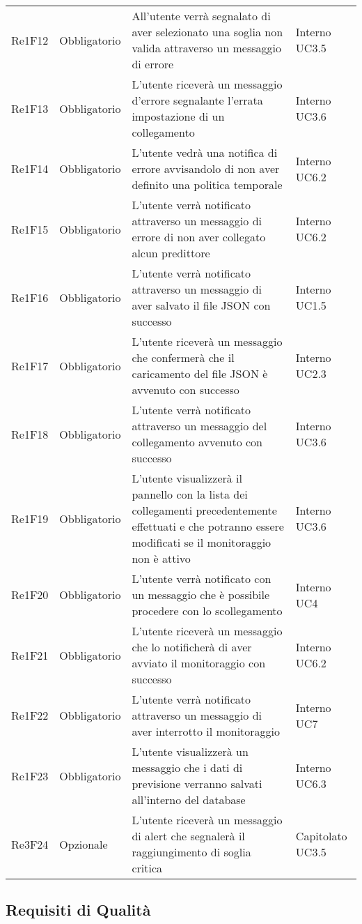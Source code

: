 \begin{longtable}{C{3cm} C{3cm} L{5.5cm} C{3cm}}
Re1F12 & Obbligatorio & All’utente verrà segnalato di aver selezionato una soglia non valida attraverso un messaggio di errore &  Interno
UC3.5\\
Re1F13 & Obbligatorio & 
L’utente riceverà un messaggio d’errore segnalante l’errata impostazione di un collegamento & Interno UC3.6\\
Re1F14 & Obbligatorio & L’utente vedrà una notifica di errore avvisandolo di non aver definito una politica temporale &  Interno UC6.2\\
Re1F15 & Obbligatorio & L’utente verrà notificato attraverso un messaggio di errore di non aver collegato alcun predittore  &  Interno
UC6.2\\
Re1F16 & Obbligatorio & L’utente verrà notificato attraverso un messaggio di aver salvato il file JSON con successo  & Interno UC1.5\\
Re1F17 & Obbligatorio & L’utente riceverà un messaggio che confermerà che il caricamento del file JSON è avvenuto con successo &  Interno UC2.3\\
Re1F18 & Obbligatorio & L’utente verrà notificato attraverso un messaggio del collegamento avvenuto con successo &  Interno
UC3.6\\
Re1F19 & Obbligatorio & L’utente visualizzerà il pannello con la lista dei collegamenti precedentemente effettuati e che potranno essere modificati se il monitoraggio non è attivo& Interno UC3.6\\
Re1F20 & Obbligatorio & L’utente verrà notificato con un messaggio che è possibile procedere con lo scollegamento &  Interno UC4\\
Re1F21 & Obbligatorio & L’utente riceverà un messaggio che lo notificherà di aver avviato il monitoraggio con successo  & Interno UC6.2\\
Re1F22 & Obbligatorio & L’utente verrà notificato attraverso un messaggio di aver interrotto il monitoraggio &  Interno UC7\\
Re1F23 & Obbligatorio & L’utente visualizzerà un messaggio che i dati di previsione verranno salvati all’interno del database & Interno UC6.3\\
Re3F24 & Opzionale & L’utente riceverà un messaggio di alert che segnalerà il raggiungimento di soglia critica & Capitolato UC3.5\\
\end{longtable}


\pagebreak
 	\subsection{Requisiti di Qualità}

